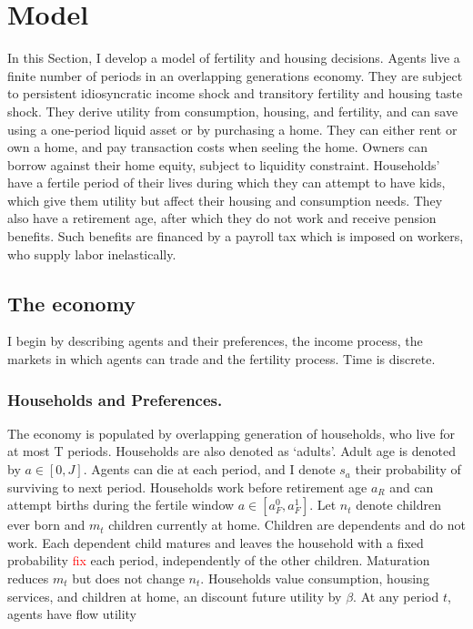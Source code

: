 \section{Model}
\label{sec:model}
In this Section, I develop a model of fertility and housing decisions. Agents live a finite number of periods in an overlapping generations economy. They are subject to persistent idiosyncratic income shock and transitory fertility and housing taste shock. They derive utility from consumption, housing, and fertility, and can save using a one-period liquid asset or by purchasing a home. They can either rent or own a home, and pay transaction costs when seeling the home. Owners can borrow against their home equity, subject to liquidity constraint. Households' have a fertile period of their lives during which they can attempt to have kids, which give them utility but affect their housing and consumption needs. They also have a retirement age, after which they do not work and receive pension benefits. Such benefits are financed by a payroll tax which is imposed on workers, who supply labor inelastically. 

\subsection{The economy}
I begin by describing agents and their preferences, the income process, the markets in which agents can trade and the fertility process. Time is discrete.\\

\subsubsection*{Households and Preferences.}
The economy is populated by overlapping generation of households, who live for at most T periods. Households are also denoted as `adults'. Adult age is denoted by $a\in[0,J]$. Agents can die at each period, and I denote $s_a$ their probability of surviving to next period.  Households work before retirement age $a_R$ and can attempt births during the
fertile window $a\in[a_F^0,a_F^1]$. Let $n_t$ denote children ever born and $m_t$ children currently
at home. Children are dependents and do not work. Each dependent child matures
and leaves the household with a fixed probability \textcolor{red}{fix} each period, independently
of the other children. Maturation reduces $m_t$ but does not change $n_t$. Households value consumption, housing services, and children at home, an discount future utility by $\beta$. At any period $t$, agents have flow utility

